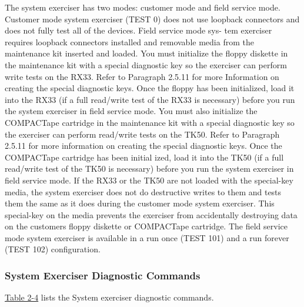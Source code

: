 The system exerciser has two modes: customer mode and field service
mode. Customer mode system exerciser (TEST 0) does not use loopback
connectors and does not fully test all of the devices. Field service mode sys-
tem exerciser requires loopback connectors installed and removable media
from the maintenance kit inserted and loaded. You must initialize the floppy
diskette in the maintenance kit with a special diagnostic key so the exerciser
can perform write tests on the RX33. Refer to Paragraph 2.5.11 for more
Information on creating the special diagnostic keys. Once the floppy has
been initialized, load it into the RX33 (if a full read/write test of the RX33 is
necessary) before you run the system exerciser in field service mode. You
must also initialize the COMPACTape cartridge in the maintenance kit with
a special diagnostic key so the exerciser can perform read/write tests on
the TK50. Refer to Paragraph 2.5.11 for more information on creating the
special diagnostic keys. Once the COMPACTape cartridge has been initial
ized, load it into the TK50 (if a full read/write test of the TK50 is necessary)
before you run the system exerciser in field service mode. If the RX33 or
the TK50 are not loaded with the special-key media, the system exerciser
does not do destructive writes to them and tests them the same as it does
during the customer mode system exerciser. This special-key on the media
prevents the exerciser from accidentally destroying data on the customers
floppy diskette or COMPACTape cartridge. The field service mode system
exerciser is available in a run once (TEST 101) and a run forever (TEST 102)
configuration.

\newpage

\subsubsection{System Exerciser Diagnostic Commands}
\hyperref[table:2-4]{Table 2-4} lists the System exerciser diagnostic commands.

